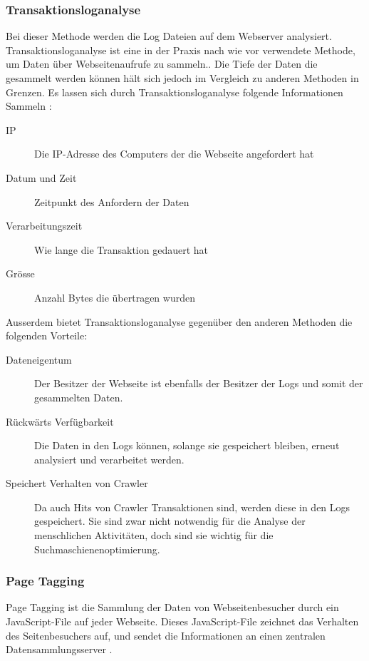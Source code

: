 
\subsubsection{Transaktionsloganalyse} 
Bei dieser Methode werden die Log Dateien auf dem Webserver analysiert. Transaktionsloganalyse ist eine in der Praxis nach wie vor verwendete Methode, um Daten über Webseitenaufrufe zu sammeln.\parencite[S. 173]{nakatani2011toolselectionmethod}. Die Tiefe der Daten die gesammelt werden können hält sich jedoch im Vergleich zu anderen Methoden in Grenzen. Es lassen sich durch Transaktionsloganalyse folgende Informationen Sammeln \parencite[S. 2]{waisberg2009webShort}:

\begin{description}
  \item[IP] Die IP-Adresse des Computers der die Webseite angefordert hat
  \item[Datum und Zeit] Zeitpunkt des Anfordern der Daten
  \item[Verarbeitungszeit] Wie lange die Transaktion gedauert hat
  \item[Grösse] Anzahl Bytes die übertragen wurden
\end{description}

Ausserdem bietet Transaktionsloganalyse gegenüber den anderen Methoden die folgenden Vorteile\parencite[S. 2]{waisberg2009webShort}:

\begin{description}
  \item[Dateneigentum] Der Besitzer der Webseite ist ebenfalls der Besitzer der Logs und somit der gesammelten Daten. 
  \item[Rückwärts Verfügbarkeit] Die Daten in den Logs können, solange sie gespeichert bleiben, erneut analysiert und verarbeitet werden. 
  \item[Speichert Verhalten von Crawler] Da auch Hits von Crawler Transaktionen sind, werden diese in den Logs gespeichert. Sie sind zwar nicht notwendig für die Analyse der menschlichen Aktivitäten, doch sind sie wichtig für die Suchmaschienenoptimierung\parencite[S. 174]{nakatani2011toolselectionmethod}. 
\end{description}


\subsubsection{Page Tagging} 
Page Tagging ist die Sammlung der Daten von Webseitenbesucher durch ein JavaScript-File auf jeder Webseite. Dieses JavaScript-File zeichnet das Verhalten des Seitenbesuchers auf, und sendet die Informationen an einen zentralen Datensammlungsserver \parencite[S. 173]{nakatani2011toolselectionmethod}.

